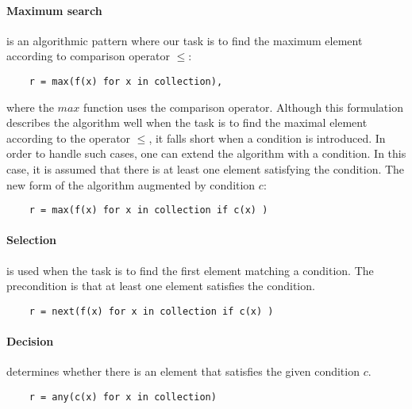 \paragraph{Maximum search}
is an algorithmic pattern where our task is to find the maximum element
according to comparison operator \( \leq \):
\begin{listing}[H]
\begin{verbatim}
    r = max(f(x) for x in collection),
\end{verbatim}
\end{listing}

where the \( max \) function uses the comparison operator. Although this
formulation describes the algorithm well when the task is to find the maximal
element according to the operator \( \leq \), it falls short when a condition is
introduced. In order to handle such cases, one can extend the algorithm with a
condition. In this case, it is assumed that there is at least one
element satisfying the condition. The new form of the algorithm augmented by
condition \( c \):

\begin{listing}[H]
\begin{verbatim}
    r = max(f(x) for x in collection if c(x) )
\end{verbatim}
\end{listing}

\paragraph{Selection}
is used when the task is to find the first element matching a condition. The
precondition is that at least one element satisfies the condition.
\begin{listing}[H]
\begin{verbatim}
    r = next(f(x) for x in collection if c(x) )
\end{verbatim}
\end{listing}


\paragraph{Decision}
 determines whether there is an element that satisfies the given condition \( c \). 
\begin{listing}[H]
\begin{verbatim}
    r = any(c(x) for x in collection)
\end{verbatim}
\end{listing}

